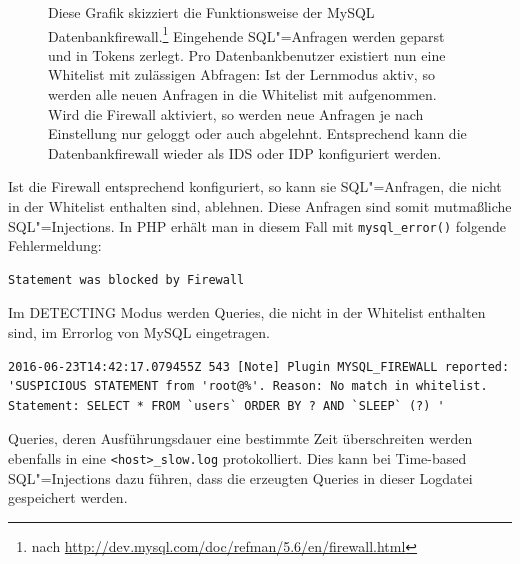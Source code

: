 \begin{figure}[ht]
\begin{margincap}
\begin{tikzpicture}[node distance = 1.5cm, every node/.style={draw=white, align=center, text centered, draw=white, font=\footnotesize\sffamily,fill=documentColor!80, text=white,inner sep=5pt,minimum width=3cm}]
\end{tikzpicture}

\caption[db firewall]{Diese Grafik skizziert die Funktionsweise der MySQL Datenbankfirewall.\footnote{\minipagefootnotefix \RaggedRight nach \url{http://dev.mysql.com/doc/refman/5.6/en/firewall.html}} Eingehende SQL"=Anfragen werden geparst und in Tokens zerlegt. Pro Datenbankbenutzer existiert nun eine Whitelist mit zulässigen Abfragen: Ist der Lernmodus aktiv, so werden alle neuen Anfragen in die Whitelist mit aufgenommen. Wird die Firewall aktiviert, so werden neue Anfragen je nach Einstellung nur geloggt oder auch abgelehnt. Entsprechend kann die Datenbankfirewall wieder als IDS oder IDP konfiguriert werden. }
\label{img:db_firewall}
\end{margincap}
\end{figure}


Ist die Firewall entsprechend konfiguriert, so kann sie SQL"=Anfragen, die nicht in der Whitelist enthalten sind, ablehnen. Diese Anfragen sind somit mutmaßliche SQL"=Injections. In PHP erhält man in diesem Fall mit \texttt{mysql_error()} folgende Fehlermeldung:

\begin{listing}[ht!]
\begin{verbatim}
Statement was blocked by Firewall
\end{verbatim}
\end{listing}


Im DETECTING Modus werden Queries, die nicht in der Whitelist enthalten sind, im Errorlog von MySQL eingetragen.
\begin{listing}[ht!]
\begin{verbatim}
2016-06-23T14:42:17.079455Z 543 [Note] Plugin MYSQL_FIREWALL reported: 'SUSPICIOUS STATEMENT from 'root@%'. Reason: No match in whitelist.
Statement: SELECT * FROM `users` ORDER BY ? AND `SLEEP` (?) '
\end{verbatim}
\end{listing}




Queries, deren Ausführungsdauer eine bestimmte Zeit überschreiten  werden ebenfalls in eine \texttt{<host>\_slow.log} protokolliert. Dies kann bei Time-based SQL"=Injections dazu führen, dass die erzeugten Queries in dieser Logdatei gespeichert werden.

